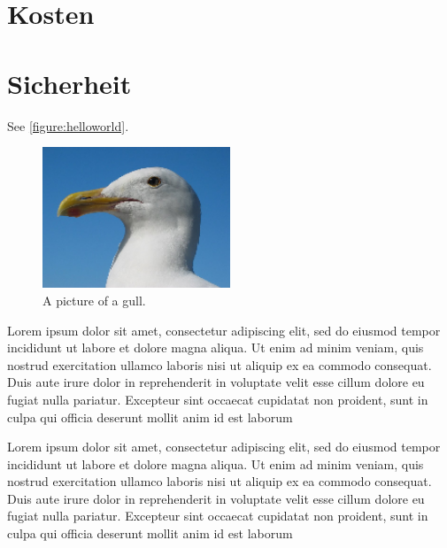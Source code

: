 {\section{Kosten}
\section{Sicherheit}

  See \ref{figure:helloworld}.

\begin{figure}[!ht] %
  \centering
  \includegraphics[width=0.5\textwidth]{images/gull.png}
  \caption{A picture of a gull.}
\end{figure}

Lorem ipsum dolor sit amet, consectetur adipiscing elit, sed do eiusmod tempor incididunt ut labore et dolore magna aliqua. Ut enim ad minim veniam, quis nostrud exercitation ullamco laboris nisi ut aliquip ex ea commodo consequat. Duis aute irure dolor in reprehenderit in voluptate velit esse cillum dolore eu fugiat nulla pariatur. Excepteur sint occaecat cupidatat non proident, sunt in culpa qui officia deserunt mollit anim id est laborum

Lorem ipsum dolor sit amet, consectetur adipiscing elit, sed do eiusmod tempor incididunt ut labore et dolore magna aliqua. Ut enim ad minim veniam, quis nostrud exercitation ullamco laboris nisi ut aliquip ex ea commodo consequat. Duis aute irure dolor in reprehenderit in voluptate velit esse cillum dolore eu fugiat nulla pariatur. Excepteur sint occaecat cupidatat non proident, sunt in culpa qui officia deserunt mollit anim id est laborum

}
